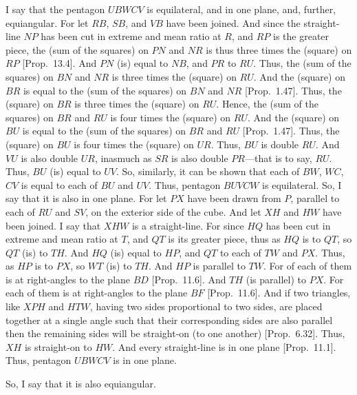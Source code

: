 \begin{Parallel}{}{}
{I say that the pentagon $UBWCV$ is equilateral, and in one plane, and,
further, equiangular. For let $RB$, $SB$, and $VB$ have been joined. 
And since the straight-line $NP$ has been cut in extreme and mean
ratio at $R$, and $RP$ is the greater piece,  the (sum of the squares)
on $PN$ and $NR$ is thus three times the (square) on $RP$ [Prop.~13.4].
And $PN$ (is) equal to $NB$, and $PR$ to $RU$. 
Thus, the (sum of the squares) on $BN$ and $NR$ is three times the
(square) on $RU$. And the (square) on $BR$ is equal to the (sum of the squares) on $BN$ and $NR$ [Prop.~1.47].  
Thus, the (square) on $BR$ is three times the (square) on $RU$. 
Hence, the (sum of the
squares) on $BR$ and $RU$ is four times the (square) on $RU$. And
the (square)
on $BU$ is equal to the (sum of the squares) on $BR$ and $RU$ [Prop.~1.47]. Thus, the (square) on $BU$ is four times the
(square) on $UR$.  Thus, $BU$ is double $RU$.  And
$VU$ is also double $UR$, inasmuch as $SR$ is also double $PR$---that is to say, $RU$. Thus, $BU$ (is) equal to $UV$. So, similarly, it can be shown
that  each of $BW$, $WC$, $CV$ is equal to each of $BU$ and $UV$. 
Thus, pentagon $BUVCW$ is equilateral. So, I say that it is also in one plane. For let $PX$ have been drawn from $P$, parallel to
each of $RU$ and $SV$, on the exterior side of the cube. And let
$XH$ and $HW$ have been joined. I say that $XHW$ is a straight-line.
For since $HQ$ has been cut in extreme and mean ratio at $T$,
and  $QT$  is its greater piece, thus as $HQ$ is to $QT$, so $QT$
(is) to $TH$. And $HQ$ (is) equal to $HP$, and $QT$ to each of
$TW$ and $PX$. Thus, as $HP$ is to $PX$, so $WT$ (is) to
$TH$. And $HP$ is parallel to $TW$. For of each of them is at right-angles
to the plane $BD$ [Prop.~11.6]. And $TH$ (is parallel) to
$PX$. For each of them is at right-angles to the plane $BF$ [Prop.~11.6].
And if two triangles, like
$XPH$ and $HTW$, having two sides proportional to two sides,
are placed together at a single angle  such that their corresponding sides are also parallel then the remaining sides will be straight-on (to one another) [Prop.~6.32]. Thus, $XH$ is straight-on to
$HW$. And every straight-line is in one plane [Prop.~11.1]. Thus,
pentagon $UBWCV$ is in one plane.

So, I say that it is also equiangular.

}
\end{Parallel}
